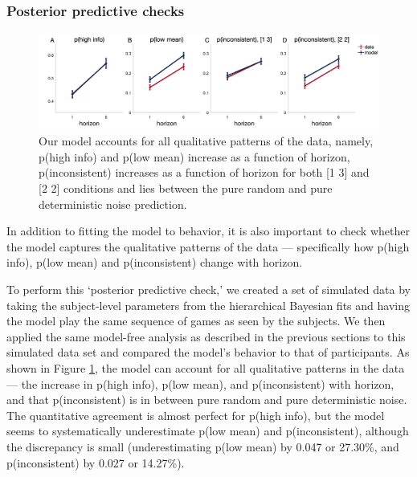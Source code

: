 \documentclass[12pt]{article}
\begin{document}
	\subsubsection*{Posterior predictive checks}
	\begin{figure}[hp]
		\begin{center}
			\includegraphics[width=1\textwidth]{figures/RanDetNoise_2noise_modelA.png}
			\caption{
			Our model accounts for all qualitative patterns of the data, namely, p(high info) and p(low mean) increase as a function of horizon, p(inconsistent) increases as a function of horizon for both [1 3] and [2 2] conditions and lies between the pure random and pure deterministic noise prediction.}
			\label{fig:mb3}
		\end{center}
	\end{figure}
	
	In addition to fitting the model to behavior, it is also important to check whether the model captures the qualitative patterns of the data \citep{Wilson2019} --- specifically how p(high info), p(low mean) and p(inconsistent) change with horizon.
	
	To perform this `posterior predictive check,' we created a set of simulated data by taking the subject-level parameters from the hierarchical Bayesian fits and having the model play the same sequence of games as seen by the subjects. We then applied the same model-free analysis as described in the previous sections to this simulated data set and compared the model's behavior to that of participants. As shown in Figure  \ref{fig:mb3}, the model can account for all qualitative patterns in the data --- the increase in p(high info), p(low mean), and p(inconsistent) with horizon, and that p(inconsistent) is in between pure random and pure deterministic noise.  The quantitative agreement is almost perfect for p(high info), but the model seems to systematically underestimate p(low mean) and p(inconsistent), although the discrepancy is small (underestimating p(low mean) by 0.047 or 27.30\%, and p(inconsistent) by 0.027 or 14.27\%).
	
\end{document}

